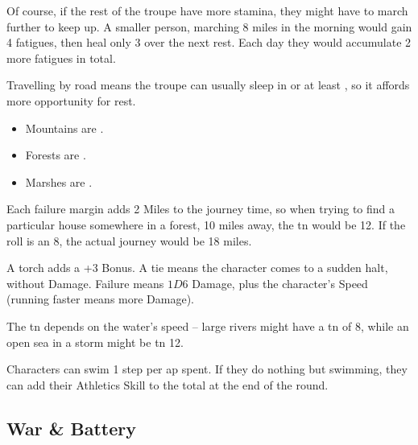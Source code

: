 \begin{multicols}{2}
Of course, if the rest of the troupe have more stamina, they might have to march further to keep up.
A smaller person, marching 8 miles in the morning would gain 4 \glspl{fatigue}, then heal only 3 over the next rest.
Each day they would accumulate 2 more \glspl{fatigue} in total.

Travelling by road means the troupe can usually sleep in  or at least , so it affords more opportunity for rest.


\begin{itemize}

  \item
    Mountains are \tn[8].
  \item
    Forests are \tn[11].
  \item
    Marshes are \tn[12].

\end{itemize}

Each failure margin adds 2 Miles to the journey time, so when trying to find a particular house somewhere in a forest, 10 miles away, the \gls{tn} would be 12.
If the roll is an 8, the actual journey would be 18 miles.



A torch adds a +3 Bonus.
A tie means the character comes to a sudden halt, without Damage.
Failure means $1D6$ Damage, plus the character's Speed (running faster means more Damage).


The \gls{tn} depends on the water's speed -- large rivers might have a \gls{tn} of 8, while an open sea in a storm might be \gls{tn} 12.

Characters can swim 1 \gls{step} per \gls{ap} spent.
If they do nothing but swimming, they can add their Athletics Skill to the total at the end of the round.

\subsection{War \& Battery}


\end{multicols}

